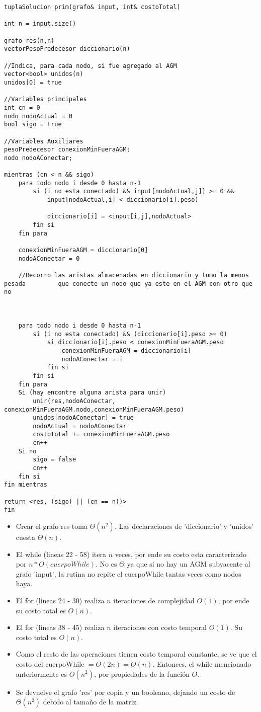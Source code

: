 \documentclass[10pt,a4paper]{article}
\begin{document}
\begin{lstlisting}
tuplaSolucion prim(grafo& input, int& costoTotal)

int n = input.size()

grafo res(n,n)
vectorPesoPredecesor diccionario(n)

//Indica, para cada nodo, si fue agregado al AGM
vector<bool> unidos(n)
unidos[0] = true

//Variables principales
int cn = 0
nodo nodoActual = 0
bool sigo = true

//Variables Auxiliares
pesoPredecesor conexionMinFueraAGM;
nodo nodoAConectar;

mientras (cn < n && sigo)
	para todo nodo i desde 0 hasta n-1
		si (i no esta conectado) && input[nodoActual,j]} >= 0 &&
		    input[nodoActual,i] < diccionario[i].peso)
		    
			diccionario[i] = <input[i,j],nodoActual>
		fin si
	fin para

	conexionMinFueraAGM = diccionario[0]
	nodoAConectar = 0

	//Recorro las aristas almacenadas en diccionario y tomo la menos pesada 		que conecte un nodo que ya este en el AGM con otro que no



	para todo nodo i desde 0 hasta n-1
		si (i no esta conectado) && (diccionario[i].peso >= 0)
			si diccionario[i].peso < conexionMinFueraAGM.peso
				conexionMinFueraAGM = diccionario[i]
				nodoAConectar = i
			fin si
		fin si
	fin para
	Si (hay encontre alguna arista para unir)
		unir(res,nodoAConectar, conexionMinFueraAGM.nodo,conexionMinFueraAGM.peso)
		unidos[nodoAConectar] = true
		nodoActual = nodoAConectar
		costoTotal += conexionMinFueraAGM.peso
		cn++
	Si no
		sigo = false
		cn++
	fin si
fin mientras

return <res, (sigo) || (cn == n))>
fin
\end{lstlisting}


\begin{itemize}
\item Crear el grafo res toma $\Theta(n^2)$. Las declaraciones de 'diccionario' y 'unidos' cuesta $\Theta(n)$.
\item El while (lineas 22 - 58) itera $n$ veces, por ende su costo esta caracterizado por $n*O(cuerpoWhile)$. No es $\Theta$ ya que si no hay un AGM subyacente al grafo 'input', la rutina no repite el cuerpoWhile tantas veces como nodos haya.
\item El for (lineas 24 - 30) realiza $n$ iteraciones de complejidad $O(1)$, por ende su costo total es $O(n)$.
\item El for (lineas 38 - 45) realiza $n$ iteraciones con costo temporal $O(1)$. Su costo total es $O(n)$.
\item Como el resto de las operaciones tienen costo temporal constante, se ve que el costo del cuerpoWhile $= O(2n) = O(n)$. Entonces, el while mencionado anteriormente es $O(n^2)$, por propiedades de la función $O$.
\item Se devuelve el grafo 'res' por copia y un booleano, dejando un costo de $\Theta(n^2)$ debido al tamaño de la matriz.
\end{itemize}
\end{document}
